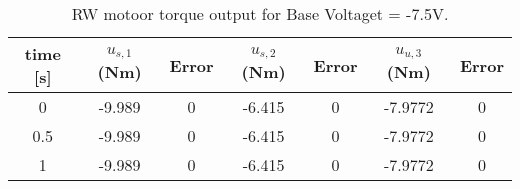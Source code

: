 \begin{table}[htbp]\caption{RW motoor torque output for Base Voltaget = -7.5V.}\label{tbl:baseVoltage-7.5}\centering\begin{tabular}{ccccccc}
\hline
  time [s]  &  $u_{s,1}$ (Nm)  &  Error  &  $u_{s,2}$ (Nm)  &  Error  &  $u_{u,3}$ (Nm)  &  Error  \\
\hline
     0      &      -9.989      &    0    &      -6.415      &    0    &     -7.9772      &    0    \\
    0.5     &      -9.989      &    0    &      -6.415      &    0    &     -7.9772      &    0    \\
     1      &      -9.989      &    0    &      -6.415      &    0    &     -7.9772      &    0    \\
\hline\end{tabular}\end{table}